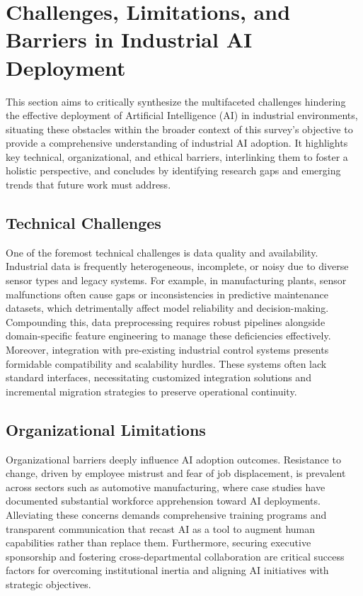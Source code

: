 \documentclass[sigconf]{acmart}
\begin{document}
\section{Challenges, Limitations, and Barriers in Industrial AI Deployment}

This section aims to critically synthesize the multifaceted challenges hindering the effective deployment of Artificial Intelligence (AI) in industrial environments, situating these obstacles within the broader context of this survey's objective to provide a comprehensive understanding of industrial AI adoption. It highlights key technical, organizational, and ethical barriers, interlinking them to foster a holistic perspective, and concludes by identifying research gaps and emerging trends that future work must address.

\subsection{Technical Challenges}

One of the foremost technical challenges is data quality and availability. Industrial data is frequently heterogeneous, incomplete, or noisy due to diverse sensor types and legacy systems. For example, in manufacturing plants, sensor malfunctions often cause gaps or inconsistencies in predictive maintenance datasets, which detrimentally affect model reliability and decision-making. Compounding this, data preprocessing requires robust pipelines alongside domain-specific feature engineering to manage these deficiencies effectively. Moreover, integration with pre-existing industrial control systems presents formidable compatibility and scalability hurdles. These systems often lack standard interfaces, necessitating customized integration solutions and incremental migration strategies to preserve operational continuity.

\subsection{Organizational Limitations}

Organizational barriers deeply influence AI adoption outcomes. Resistance to change, driven by employee mistrust and fear of job displacement, is prevalent across sectors such as automotive manufacturing, where case studies have documented substantial workforce apprehension toward AI deployments. Alleviating these concerns demands comprehensive training programs and transparent communication that recast AI as a tool to augment human capabilities rather than replace them. Furthermore, securing executive sponsorship and fostering cross-departmental collaboration are critical success factors for overcoming institutional inertia and aligning AI initiatives with strategic objectives.
\end{document}
